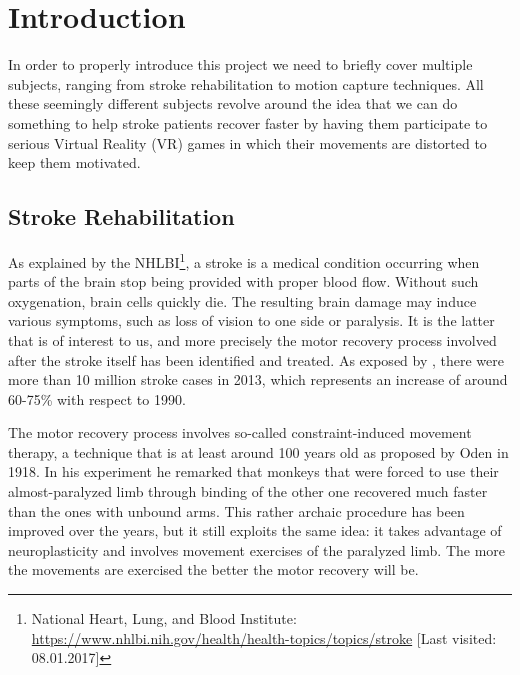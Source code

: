 
\chapter{Introduction} %

\label{Chapter1} %


In order to properly introduce this project we need to briefly cover multiple subjects, ranging from stroke rehabilitation to motion capture techniques. All these seemingly different subjects revolve around the idea that we can do something to help stroke patients recover faster by having them participate to serious Virtual Reality (VR) games in which their movements are distorted to keep them motivated.

\section{Stroke Rehabilitation}
As explained by the NHLBI\footnote{National Heart, Lung, and Blood Institute: \url{https://www.nhlbi.nih.gov/health/health-topics/topics/stroke} [Last visited: 08.01.2017]}, a stroke is a medical condition occurring when parts of the brain stop being provided with proper blood flow. Without such oxygenation, brain cells quickly die. The resulting brain damage may induce various symptoms, such as loss of vision to one side or paralysis. It is the latter that is of interest to us, and more precisely the motor recovery process involved after the stroke itself has been identified and treated. As exposed by \cite{vos2015global}, there were more than 10 million stroke cases in 2013, which represents an increase of around 60-75\% with respect to 1990.

The motor recovery process involves so-called constraint-induced movement therapy, a technique that is at least around 100 years old as proposed by Oden \cite{oden1918systematic} in 1918. In his experiment he remarked that monkeys that were forced to use their almost-paralyzed limb through binding of the other one recovered much faster than the ones with unbound arms. This rather archaic procedure has been improved over the years, but it still exploits the same idea: it takes advantage of neuroplasticity and involves movement exercises of the paralyzed limb. The more the movements are exercised the better the motor recovery will be.

